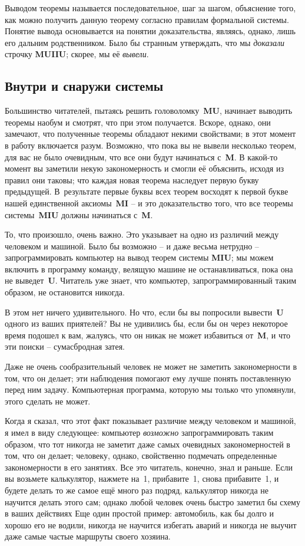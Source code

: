 \documentclass[../main.tex]{subfiles}
\begin{document}
Выводом теоремы называется последовательное, шаг за шагом, объяснение того, как можно получить данную теорему согласно правилам формальной системы. Понятие вывода основывается на понятии доказательства, являясь, однако, лишь его дальним родственником. Было бы странным утверждать, что мы \emph{доказали} строчку \textbf{MUIIU}; скорее, мы её \emph{вывели}.


\subsection{Внутри и снаружи системы}

Большинство читателей, пытаясь решить головоломку~\textbf{MU}, начинает выводить теоремы наобум и смотрят, что при этом получается. Вскоре, однако, они замечают, что полученные теоремы обладают некими свойствами; в этот момент в работу включается разум. Возможно, что пока вы не вывели несколько теорем, для вас не было очевидным, что все они будут начинаться с~\textbf{M}\@. В какой-то момент вы заметили некую закономерность и смогли её объяснить, исходя из правил они таковы; что каждая новая теорема наследует первую букву предыдущей. В~результате первые буквы всех теорем восходят к первой букве нашей единственной аксиомы~\textbf{MI} \--- и это доказательство того, что все теоремы системы~\textbf{MIU} должны начинаться с~\textbf{M}.

То, что произошло, очень важно. Это указывает на одно из различий между человеком и машиной. Было бы возможно \--- и даже весьма нетрудно \--- запрограммировать компьютер на вывод теорем системы \textbf{MIU}; мы можем включить в программу команду, велящую машине не останавливаться, пока она не выведет~\textbf{U}\@. Читатель уже знает, что компьютер, запрограммированный таким образом, не остановится никогда.

В этом нет ничего удивительного. Но что, если бы вы попросили вывести~\textbf{U} одного из ваших приятелей? Вы не удивились бы, если бы он через некоторое время подошел к вам, жалуясь, что он никак не может избавиться от~\textbf{M}, и что эти поиски \--- сумасбродная затея.

Даже не очень сообразительный человек не может не заметить закономерности в том, что он делает; эти наблюдения помогают ему лучше понять поставленную перед ним задачу. Компьютерная программа, которую мы только что упомянули, этого сделать не может.

Когда я сказал, что этот факт показывает различие между человеком и машиной, я имел в виду следующее: компьютер \emph{возможно} запрограммировать таким образом, что тот никогда не заметит даже самых очевидных закономерностей в том, что он делает; человеку, однако, свойственно подмечать определенные закономерности в его занятиях. Все это читатель, конечно, знал и раньше. Если вы возьмете калькулятор, нажмете на~1, прибавите~1, снова прибавите~1, и будете делать то же самое ещё много раз подряд, калькулятор никогда не научится делать этого сам; однако любой человек очень быстро заметил бы схему в ваших действиях Еще один простой пример: автомобиль, как бы долго и хорошо его не водили, никогда не научится избегать аварий и никогда не выучит даже самые частые маршруты своего хозяина.
\end{document}
